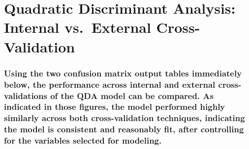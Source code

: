\documentclass[american,]{article}
\begin{document}
\hypertarget{quadratic-discriminant-analysis-internal-vs.-external-cross-validation}{%
\section{\texorpdfstring{\textbf{Quadratic Discriminant Analysis: Internal vs.~External Cross-Validation}}{Quadratic Discriminant Analysis: Internal vs.~External Cross-Validation}}\label{quadratic-discriminant-analysis-internal-vs.-external-cross-validation}}

\hypertarget{using-the-two-confusion-matrix-output-tables-immediately-below-the-performance-across-internal-and-external-cross-validations-of-the-qda-model-can-be-compared.-as-indicated-in-those-figures-the-model-performed-highly-similarly-across-both-cross-validation-techniques-indicating-the-model-is-consistent-and-reasonably-fit-after-controlling-for-the-variables-selected-for-modeling.}{%
\subsubsection{Using the two confusion matrix output tables immediately below, the performance across internal and external cross-validations of the QDA model can be compared. As indicated in those figures, the model performed highly similarly across both cross-validation techniques, indicating the model is consistent and reasonably fit, after controlling for the variables selected for modeling.}\label{using-the-two-confusion-matrix-output-tables-immediately-below-the-performance-across-internal-and-external-cross-validations-of-the-qda-model-can-be-compared.-as-indicated-in-those-figures-the-model-performed-highly-similarly-across-both-cross-validation-techniques-indicating-the-model-is-consistent-and-reasonably-fit-after-controlling-for-the-variables-selected-for-modeling.}}
\end{document}

